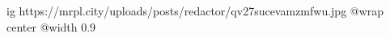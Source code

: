  
 
 
 
 

\ifcmt
  ig https://mrpl.city/uploads/posts/redactor/qv27sucevamzmfwu.jpg
  @wrap center
  @width 0.9
\fi
